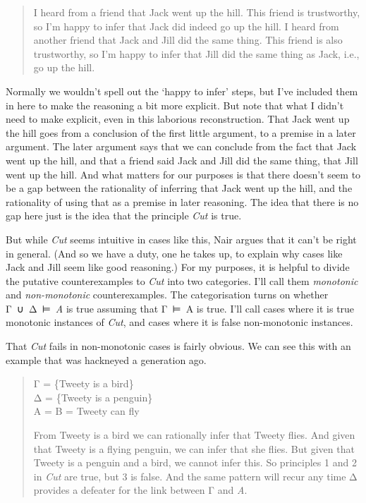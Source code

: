 \documentclass[
  12pt,
  letterpaper,
]{scrbook}
\begin{document}
\begin{quote}
I heard from a friend that Jack went up the hill. This friend is
trustworthy, so I'm happy to infer that Jack did indeed go up the hill.
I heard from another friend that Jack and Jill did the same thing. This
friend is also trustworthy, so I'm happy to infer that Jill did the same
thing as Jack, i.e., go up the hill.
\end{quote}

Normally we wouldn't spell out the `happy to infer' steps, but I've
included them in here to make the reasoning a bit more explicit. But
note that what I didn't need to make explicit, even in this laborious
reconstruction. That Jack went up the hill goes from a conclusion of the
first little argument, to a premise in a later argument. The later
argument says that we can conclude from the fact that Jack went up the
hill, and that a friend said Jack and Jill did the same thing, that Jill
went up the hill. And what matters for our purposes is that there
doesn't seem to be a gap between the rationality of inferring that Jack
went up the hill, and the rationality of using that as a premise in
later reasoning. The idea that there is no gap here just is the idea
that the principle \emph{Cut} is true.

But while \emph{Cut} seems intuitive in cases like this, Nair argues
that it can't be right in general. (And so we have a duty, one he takes
up, to explain why cases like Jack and Jill seem like good reasoning.)
For my purposes, it is helpful to divide the putative counterexamples to
\emph{Cut} into two categories. I'll call them \emph{monotonic} and
\emph{non-monotonic} counterexamples. The categorisation turns on
whether Γ~∪~Δ~⊨~\emph{A} is true assuming that Γ~⊨~A is true. I'll call
cases where it is true monotonic instances of \emph{Cut}, and cases
where it is false non-monotonic instances.

That \emph{Cut} fails in non-monotonic cases is fairly obvious. We can
see this with an example that was hackneyed a generation ago.

\begin{quote}
Γ = \{Tweety is a bird\}\\
Δ = \{Tweety is a penguin\}\\
A = B = Tweety can fly

From Tweety is a bird we can rationally infer that Tweety flies. And
given that Tweety is a flying penguin, we can infer that she flies. But
given that Tweety is a penguin and a bird, we cannot infer this. So
principles 1 and 2 in \emph{Cut} are true, but 3 is false. And the same
pattern will recur any time Δ provides a defeater for the link between Γ
and \emph{A}.
\end{quote}
\end{document}
